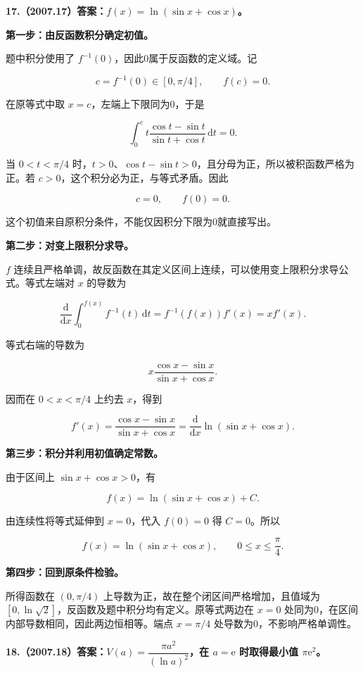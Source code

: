 \documentclass[UTF8,11pt,fontset=windows]{ctexart}
\begin{document}
\textbf{17.（2007.17）答案：$f(x)=\ln(\sin x+\cos x)$。}

\textbf{第一步：由反函数积分确定初值。}

题中积分使用了 $f^{-1}(0)$，因此0属于反函数的定义域。记

$$
c=f^{-1}(0)\in[0,\pi/4],
\qquad f(c)=0.
$$

在原等式中取 $x=c$，左端上下限同为0，于是

$$
\int_0^c t\frac{\cos t-\sin t}{\sin t+\cos t}\,\mathrm dt=0.
$$

当 $0<t<\pi/4$ 时，$t>0$、$\cos t-\sin t>0$，且分母为正，所以被积函数严格为正。若 $c>0$，这个积分必为正，与等式矛盾。因此

$$
c=0,\qquad\boxed{f(0)=0}.
$$

这个初值来自原积分条件，不能仅因积分下限为0就直接写出。

\textbf{第二步：对变上限积分求导。}

$f$ 连续且严格单调，故反函数在其定义区间上连续，可以使用变上限积分求导公式。等式左端对 $x$ 的导数为

$$
\frac{\mathrm d}{\mathrm dx}\int_0^{f(x)}f^{-1}(t)\,\mathrm dt
=f^{-1}(f(x))f'(x)=xf'(x).
$$

等式右端的导数为

$$
x\frac{\cos x-\sin x}{\sin x+\cos x}.
$$

因而在 $0<x<\pi/4$ 上约去 $x$，得到

$$
f'(x)=\frac{\cos x-\sin x}{\sin x+\cos x}
=\frac{\mathrm d}{\mathrm dx}\ln(\sin x+\cos x).
$$

\textbf{第三步：积分并利用初值确定常数。}

由于区间上 $\sin x+\cos x>0$，有

$$
f(x)=\ln(\sin x+\cos x)+C.
$$

由连续性将等式延伸到 $x=0$，代入 $f(0)=0$ 得 $C=0$。所以

$$
\boxed{f(x)=\ln(\sin x+\cos x),\qquad0\le x\le\frac\pi4.}
$$

\textbf{第四步：回到原条件检验。}

所得函数在 $(0,\pi/4)$ 上导数为正，故在整个闭区间严格增加，且值域为 $[0,\ln\sqrt2]$，反函数及题中积分均有定义。原等式两边在 $x=0$ 处同为0，在区间内部导数相同，因此两边恒相等。端点 $x=\pi/4$ 处导数为0，不影响严格单调性。

\clearpage

\textbf{18.（2007.18）答案：$V(a)=\dfrac{\pi a^2}{(\ln a)^2}$，在 $a=\mathrm e$ 时取得最小值 $\pi\mathrm e^2$。}
\end{document}
